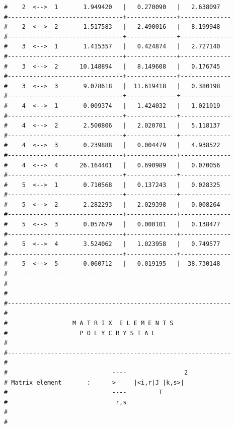 \begin{enumerate}
{\begin{verbatim}
#    2  <-->  1       1.949420   |   0.270090   |   2.638097   
#--------------------------------+--------------+--------------
#    2  <-->  2       1.517583   |   2.490016   |   8.199948   
#--------------------------------+--------------+--------------
#    3  <-->  1       1.415357   |   0.424874   |   2.727140   
#--------------------------------+--------------+--------------
#    3  <-->  2      10.148894   |   8.149608   |   0.176745   
#--------------------------------+--------------+--------------
#    3  <-->  3       9.078618   |  11.619418   |   0.380198   
#--------------------------------+--------------+--------------
#    4  <-->  1       0.009374   |   1.424032   |   1.021019   
#--------------------------------+--------------+--------------
#    4  <-->  2       2.500806   |   2.020701   |   5.118137   
#--------------------------------+--------------+--------------
#    4  <-->  3       0.239888   |   0.004479   |   4.938522   
#--------------------------------+--------------+--------------
#    4  <-->  4      26.164401   |   0.690989   |   0.070056   
#--------------------------------+--------------+--------------
#    5  <-->  1       0.710568   |   0.137243   |   0.028325   
#--------------------------------+--------------+--------------
#    5  <-->  2       2.282293   |   2.029398   |   0.008264   
#--------------------------------+--------------+--------------
#    5  <-->  3       0.057679   |   0.000101   |   0.138477   
#--------------------------------+--------------+--------------
#    5  <-->  4       3.524062   |   1.023958   |   0.749577   
#--------------------------------+--------------+--------------
#    5  <-->  5       0.060712   |   0.019195   |  38.730148   
#-------------------------------------------------------------- 
#
#
#-------------------------------------------------------------- 
#                                                              
#                  M A T R I X  E L E M E N T S                
#                    P O L Y C R Y S T A L                     
#                                                              
#--------------------------------------------------------------
#                                                              
#                             ----                2            
# Matrix element       :      >     |<i,r|J |k,s>|             
#                             ----         T                   
#                              r,s                             
#                                                              
#                                                              

\end{verbatim}}
\end{enumerate}
